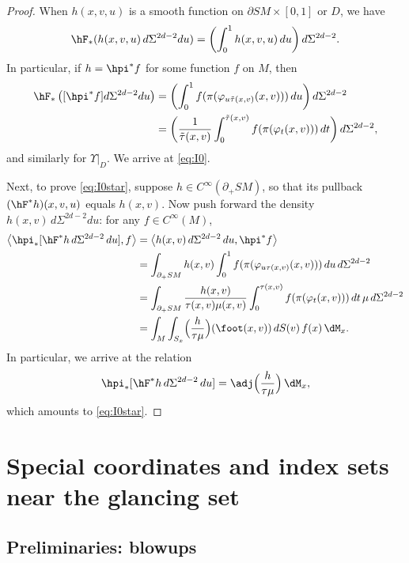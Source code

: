 \begin{proof}
When $h(x,v,u)$ is a smooth function on $\partial SM \times [0,1]$ or $D$, we have
\begin{equation*}
\hF_* (h(x,v,u)\, d\Sigma^{2d-2} du) = \biggl(\int_0^1 h(x,v,u)\, du \biggr)\,d\Sigma^{2d-2}.
\end{equation*}
In particular, if $h = \hpi^* f$ for some function $f$ on $M$, then
\begin{equation*}%
\begin{aligned}
\hF_* \left([\hpi^* f]d\Sigma^{2d-2} du \right) &= \biggl(\int_0^1 f(\pi(\varphi_{u\tilde \tau(x,v)}(x,v)))\,du\biggr)\,d\Sigma^{2d-2} \\
&= \biggl(\frac{1}{\tilde\tau(x,v)} \int_0^{\tilde \tau(x,v)} f(\pi(\varphi_t(x,v)))\,dt\biggr)\,d\Sigma^{2d-2},
\end{aligned}
\end{equation*}
and similarly for $\Upsilon|_D$. We arrive at \eqref{eq:I0}.

Next, to prove \eqref{eq:I0star}, suppose $h \in C^\infty(\partial_+ SM)$, so that its pullback $(\hF^* h)(x,v,u)$ equals $h(x,v)$.
Now push forward the density $h(x,v)\,d\Sigma^{2d-2} du$: for any $f\in C^\infty(M)$,
\begin{align*}
\left\langle \hpi_* [\hF^* h\,d\Sigma^{2d-2}\,du], f \right\rangle &= \left\langle h(x,v)\,d\Sigma^{2d-2}\,du, \hpi^* f\right\rangle \\
&= \int_{\partial_+ SM} h(x,v) \int_0^1 f(\pi(\varphi_{u\tau(x,v)}(x,v)))\,du\,d\Sigma^{2d-2} \\
&= \int_{\partial_+ SM} \frac{h(x,v)}{\tau(x,v) \mu(x,v)} \int_{0}^{\tau(x,v)} f(\pi(\varphi_t(x,v)))\,dt\,\mu\,d\Sigma^{2d-2} \\
&= \int_M \int_{S_x} \Bigl(\frac{h}{\tau\mu}\Bigr)(\foot(x,v))\,dS(v)\,f(x)\,\dM_x.
\end{align*}
In particular, we arrive at the relation
\begin{equation*}
\hpi_* [\hF^* h\,d\Sigma^{2d-2}\,du] = \adj \Bigl(\frac{h}{\tau\mu} \Bigr)\,\dM_x,
\end{equation*}
which amounts to \eqref{eq:I0star}.
\end{proof}

\section{Special coordinates and index sets near the glancing set}

\subsection{Preliminaries: blowups} \label{sec:blowup}

